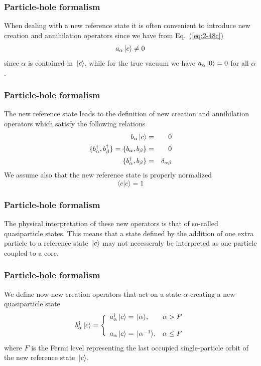 \frame
{
  \frametitle{Particle-hole formalism}
\begin{small}
{\scriptsize
When dealing with a new reference state it is often convenient to introduce 
new creation and annihilation operators since we have 
from Eq.~(\ref{eq:2-48c})
\begin{equation}
	a_\alpha \ket{c} \neq 0 \label{eq:2-49}
\end{equation}
since  $\alpha$ is contained  in $\,|{c}\rangle$, while for the true vacuum we have 
$a_\alpha \,|{0}\rangle = 0$ for all $\alpha$.
}
\end{small}
}


\frame
{
  \frametitle{Particle-hole formalism}
\begin{small}
{\scriptsize
The new reference state leads to the definition of new creation and annihilation operators
which satisfy the following relations
\begin{eqnarray}
	b_\alpha \ket{c} &=& 0 \label{eq:2-50a} \\
	\{b_\alpha^\dagger , b_\beta^\dagger \} = \{b_\alpha , b_\beta \} &=& 0 \nonumber  \\
	\{b_\alpha^\dagger , b_\beta \} &=& \delta_{\alpha \beta} \label{eq:2-50c}
\end{eqnarray}
We assume also that the new reference state is properly normalized
\begin{equation}
	\langle c | c \rangle = 1 \label{eq:2-51}
\end{equation}
}
\end{small}
}


\frame
{
  \frametitle{Particle-hole formalism}
\begin{small}
{\scriptsize
The physical interpretation of these new operators is that of so-called quasiparticle states.
This means that a state defined by the addition of one extra particle to a reference state 
$\,|{c}\rangle$ may not necesseraly be interpreted as one particle coupled to a core.
}
\end{small}
}


\frame
{
  \frametitle{Particle-hole formalism}
\begin{small}
{\scriptsize
We define now new creation operators that act on a state $\alpha$ creating a new quasiparticle state
\begin{equation}
	b_\alpha^\dagger\ket{c} = \Bigg\{ \begin{array}{ll}
		a_\alpha^\dagger \ket{c} = \ket{\alpha}, & \alpha > F \\
		\\
		a_\alpha \ket{c} = \ket{\alpha^{-1}}, & \alpha \leq F
	\end{array} \label{eq:2-52}
\end{equation}
where $F$ is the Fermi level representing the last  occupied single-particle orbit 
of the new reference state $\,|{c}\rangle$. 
}
\end{small}
}


